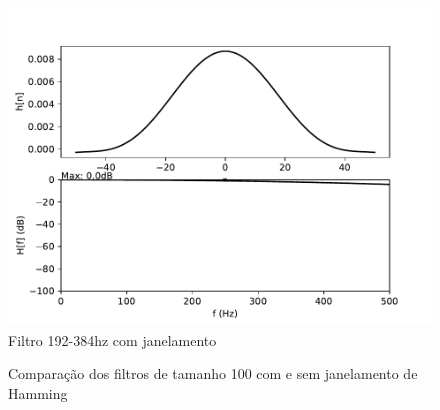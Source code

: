 \begin{figure}[H]
\begin{center}
            \includegraphics[scale=0.4]{fig/100/Hamming/windowfilter3.pdf}\\
            \small{Filtro 192-384hz com janelamento}
        \end{center}
    \endminipage
    \begin{center}
        \caption{Comparação dos filtros de tamanho 100 com e sem janelamento de Hamming}
        \label{fig:low 100}
    \end{center}
\end{figure}

